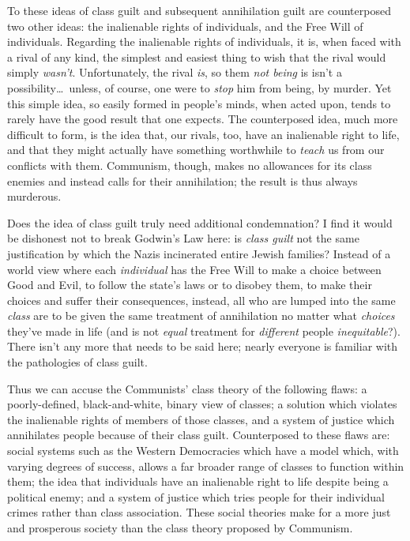\documentclass{article}
\begin{document}
To these ideas of class guilt and subsequent annihilation guilt are counterposed two other ideas: the inalienable rights of individuals, and the Free Will of individuals.  Regarding the inalienable rights of individuals, it is, when faced with a rival of any kind, the simplest and easiest thing to wish that the rival would simply \emph{wasn't}.  Unfortunately, the rival \emph{is}, so them \emph{not being} is isn't a possibility\ldots~unless, of course, one were to \emph{stop} him from being, by murder.  Yet this simple idea, so easily formed in people's minds, when acted upon, tends to rarely have the good result that one expects.  The counterposed idea, much more difficult to form, is the idea that, our rivals, too, have an inalienable right to life, and that they might actually have something worthwhile to \emph{teach} us from our conflicts with them.  Communism, though, makes no allowances for its class enemies and instead calls for their annihilation; the result is thus always murderous.

Does the idea of class guilt truly need additional condemnation?  I find it would be dishonest not to break Godwin's Law here: is \emph{class guilt} not the same justification by which the Nazis incinerated entire Jewish families?  Instead of a world view where each \emph{individual} has the Free Will to make a choice between Good and Evil, to follow the state's laws or to disobey them, to make their choices and suffer their consequences, instead, all who are lumped into the same \emph{class} are to be given the same treatment of annihilation no matter what \emph{choices} they've made in life (and is not \emph{equal} treatment for \emph{different} people \emph{inequitable}?).  There isn't any more that needs to be said here; nearly everyone is familiar with the pathologies of class guilt.

Thus we can accuse the Communists' class theory of the following flaws: a poorly-defined, black-and-white, binary view of classes; a solution which violates the inalienable rights of members of those classes, and a system of justice which annihilates people because of their class guilt.  Counterposed to these flaws are: social systems such as the Western Democracies which have a model which, with varying degrees of success, allows a far broader range of classes to function within them; the idea that individuals have an inalienable right to life despite being a political enemy; and a system of justice which tries people for their individual crimes rather than class association.  These social theories make for a more just and prosperous society than the class theory proposed by Communism.
\end{document}
